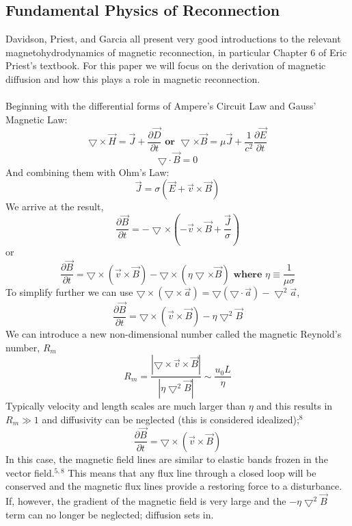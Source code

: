 \documentclass{article}
\begin{document}
\subsection{Fundamental Physics of Reconnection}
Davidson, Priest, and Garcia all present very good introductions to the relevant magnetohydrodynamics of magnetic reconnection, in particular Chapter 6 of Eric Priest's textbook.  For this paper we will focus on the derivation of magnetic diffusion and how this plays a role in magnetic reconnection.\\\\
Beginning with the differential forms of Ampere's Circuit Law and Gauss' Magnetic Law:
$$\bigtriangledown \times \vec{H}=\vec{J}+\frac{\partial \vec{D}}{\partial t} \textbf{ or } \bigtriangledown \times \vec{B}=\mu\vec{J}+\frac{1}{c^2}\frac{\partial \vec{E}}{\partial t}$$
$$\bigtriangledown \cdot \vec{B} = 0$$
And combining them with Ohm's Law:
$$\vec{J}=\sigma\left(\vec{E}+\vec{v}\times\vec{B}\right)$$
We arrive at the result,
$$\frac{\partial\vec{B}}{\partial t}=-\bigtriangledown\times\left(-\vec{v}\times\vec{B}+\frac{\vec{J}}{\sigma}\right)$$
or
$$\frac{\partial\vec{B}}{\partial t}=\bigtriangledown\times\left(\vec{v}\times\vec{B}\right)-\bigtriangledown\times\left(\eta\bigtriangledown\times\vec{B}\right) \textbf{ where }\eta\equiv\frac{1}{\mu\sigma}$$
To simplify further we can use $\bigtriangledown\times\left(\bigtriangledown\times\vec{a}\right)=\bigtriangledown\left(\bigtriangledown\cdot\vec{a}\right)-\bigtriangledown^2\vec{a}$,
$$\frac{\partial\vec{B}}{\partial t}=\bigtriangledown\times\left(\vec{v}\times\vec{B}\right)-\eta\bigtriangledown^2\vec{B}$$
We can introduce a new non-dimensional number called the magnetic Reynold's number, $R_m$
$$R_m=\frac{\left|\bigtriangledown\times\vec{v}\times\vec{B}\right|}{\left|\eta\bigtriangledown^2\vec{B}\right|}\sim\frac{u_0 L}{\eta}$$
Typically velocity and length scales are much larger than $\eta$ and this results in $R_m\gg1$ and diffusivity can be neglected (this is considered idealized);$^{8}$
$$\frac{\partial\vec{B}}{\partial t}=\bigtriangledown\times\left(\vec{v}\times\vec{B}\right)$$
In this case, the magnetic field lines are similar to elastic bands frozen in the vector field.$^{5,8}$  This means that any flux line through a closed loop will be conserved and the magnetic flux lines provide a restoring force to a disturbance.  If, however, the gradient of the magnetic field is very large and the $-\eta \bigtriangledown^2\vec{B}$ term can no longer be neglected; diffusion sets in.\\\\
\end{document}
